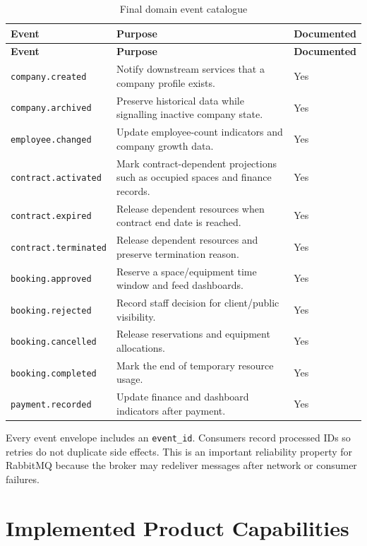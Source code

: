 \documentclass[12pt,a4paper]{report}
\begin{document}
\begin{longtable}{L{0.28\textwidth}L{0.56\textwidth}C{0.10\textwidth}}
\caption{Final domain event catalogue}\label{tab:event-catalogue}\\
\toprule
\textbf{Event} & \textbf{Purpose} & \textbf{Documented} \\
\midrule
\endfirsthead
\toprule
\textbf{Event} & \textbf{Purpose} & \textbf{Documented} \\
\midrule
\endhead
\texttt{company.created} & Notify downstream services that a company profile exists. & Yes \\
\texttt{company.archived} & Preserve historical data while signalling inactive company state. & Yes \\
\texttt{employee.changed} & Update employee-count indicators and company growth data. & Yes \\
\texttt{contract.activated} & Mark contract-dependent projections such as occupied spaces and finance records. & Yes \\
\texttt{contract.expired} & Release dependent resources when contract end date is reached. & Yes \\
\texttt{contract.terminated} & Release dependent resources and preserve termination reason. & Yes \\
\texttt{booking.approved} & Reserve a space/equipment time window and feed dashboards. & Yes \\
\texttt{booking.rejected} & Record staff decision for client/public visibility. & Yes \\
\texttt{booking.cancelled} & Release reservations and equipment allocations. & Yes \\
\texttt{booking.completed} & Mark the end of temporary resource usage. & Yes \\
\texttt{payment.recorded} & Update finance and dashboard indicators after payment. & Yes \\
\bottomrule
\end{longtable}

Every event envelope includes an \texttt{event\_id}. Consumers record processed
IDs so retries do not duplicate side effects. This is an important reliability
property for RabbitMQ because the broker may redeliver messages after network or
consumer failures.

\chapter{Implemented Product Capabilities}
\label{ch:capabilities}
\end{document}
